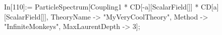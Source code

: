 In[110]:= ParticleSpectrum[Coupling1 * CD[-a][ScalarField[]] * CD[a][ScalarField[]], TheoryName -> "MyVeryCoolTheory", Method -> "InfiniteMonkeys", MaxLaurentDepth -> 3]; 